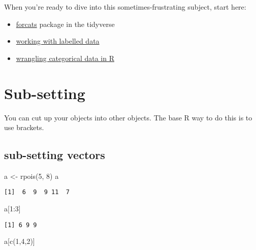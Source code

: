 \documentclass[
  letterpaper,
  DIV=11,
  numbers=noendperiod]{scrreprt}
\newenvironment{Shaded}{\begin{snugshade}}{\end{snugshade}}
\newcommand{\DecValTok}[1]{\textcolor[rgb]{0.68,0.00,0.00}{#1}}
\newcommand{\FunctionTok}[1]{\textcolor[rgb]{0.28,0.35,0.67}{#1}}
\newcommand{\NormalTok}[1]{\textcolor[rgb]{0.00,0.23,0.31}{#1}}
\newcommand{\OtherTok}[1]{\textcolor[rgb]{0.00,0.23,0.31}{#1}}
\newcommand{\SpecialCharTok}[1]{\textcolor[rgb]{0.37,0.37,0.37}{#1}}
\providecommand{\tightlist}{%
  \setlength{\itemsep}{0pt}\setlength{\parskip}{0pt}}\usepackage{longtable,booktabs,array}
\begin{document}
When you're ready to dive into this sometimes-frustrating subject, start
here:

\begin{itemize}
\tightlist
\item
  \href{https://forcats.tidyverse.org/}{forcats} package in the
  tidyverse
\item
  \href{https://cran.r-project.org/web/packages/sjlabelled/vignettes/labelleddata.html}{working
  with labelled data}
\item
  \href{https://peerj.com/preprints/3163/}{wrangling categorical data in
  R}
\end{itemize}

\section{Sub-setting}\label{sub-setting}

You can cut up your objects into other objects. The base R way to do
this is to use brackets.

\subsection{sub-setting vectors}\label{sub-setting-vectors}

\begin{Shaded}
\begin{Highlighting}[]
\NormalTok{a }\OtherTok{\textless{}{-}} \FunctionTok{rpois}\NormalTok{(}\DecValTok{5}\NormalTok{, }\DecValTok{8}\NormalTok{)}
\NormalTok{a}
\end{Highlighting}
\end{Shaded}

\begin{verbatim}
[1]  6  9  9 11  7
\end{verbatim}

\begin{Shaded}
\begin{Highlighting}[]
\NormalTok{a[}\DecValTok{1}\SpecialCharTok{:}\DecValTok{3}\NormalTok{]}
\end{Highlighting}
\end{Shaded}

\begin{verbatim}
[1] 6 9 9
\end{verbatim}

\begin{Shaded}
\begin{Highlighting}[]
\NormalTok{a[}\FunctionTok{c}\NormalTok{(}\DecValTok{1}\NormalTok{,}\DecValTok{4}\NormalTok{,}\DecValTok{2}\NormalTok{)]}
\end{Highlighting}
\end{Shaded}
\end{document}
